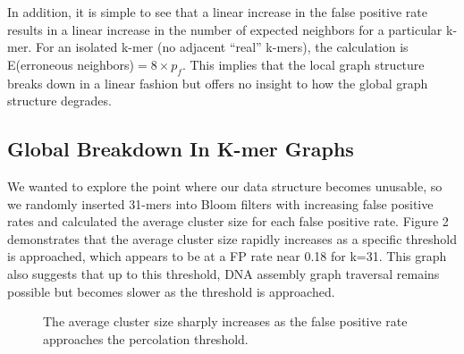\documentclass[12pt]{article} \usepackage{simplemargins}
\begin{document}
In addition, it is simple to see that a linear increase in the false 
positive rate results in a linear increase in the number of expected 
neighbors for a particular k-mer. For an isolated k-mer (no adjacent 
``real'' k-mers), the calculation is 
E(erroneous neighbors)$ = 8 \times p_f$. This implies that the local graph 
structure breaks down in a linear fashion but offers no insight 
to how the global graph structure degrades.

\subsection{Global Breakdown In K-mer Graphs}
We wanted to explore the point where our data structure becomes unusable, 
so we randomly inserted 31-mers into Bloom
filters with increasing false positive rates and calculated the average
cluster size for each false positive rate. Figure 2 demonstrates that 
the average cluster
size rapidly increases as a specific threshold is approached,
which appears to be at a FP rate near 0.18 for k=31. This
graph also suggests that up to this threshold, DNA assembly graph 
traversal remains possible but becomes slower as the threshold is
approached.

\begin{figure}
\caption{The average cluster size sharply increases as the false positive 
rate approaches the percolation threshold.
}
\end{figure}
\end{document}
